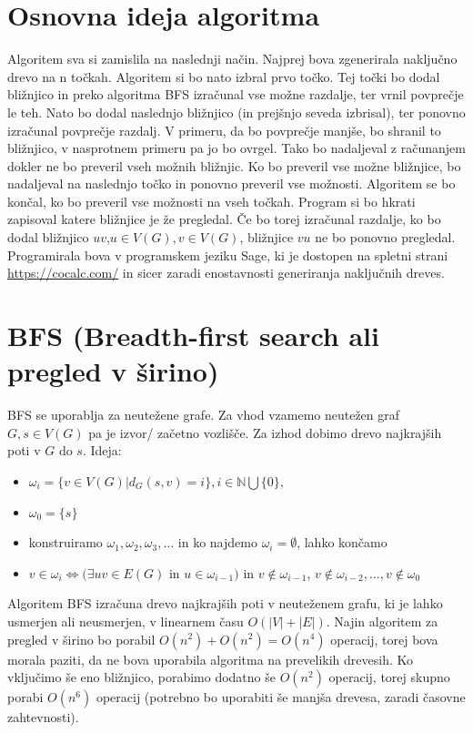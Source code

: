 \documentclass[a4paper,10pt]{article}
\begin{document}
\section{Osnovna ideja algoritma}
Algoritem sva si zamislila na naslednji način. Najprej bova zgenerirala naključno drevo na n točkah. Algoritem si bo nato izbral prvo točko. Tej točki bo dodal bližnjico in preko algoritma BFS izračunal vse možne razdalje, ter vrnil povprečje le teh. Nato bo dodal naslednjo bližnjico (in prejšnjo seveda izbrisal), ter ponovno izračunal povprečje razdalj. V primeru, da bo povprečje manjše, bo shranil to bližnjico, v nasprotnem primeru pa jo bo ovrgel. Tako bo nadaljeval z računanjem dokler ne bo preveril vseh možnih bližnjic. Ko bo preveril vse možne bližnjice, bo nadaljeval na naslednjo točko in ponovno preveril vse možnosti. Algoritem se bo končal, ko bo preveril vse možnosti na vseh točkah. 
\newline
Program si bo hkrati zapisoval katere bližnjice je že pregledal. Če bo torej izračunal razdalje, ko bo dodal bližnjico $uv$,$u \in V(G),v\in V(G)$, bližnjice $vu$ ne bo ponovno pregledal.
\newline
Programirala bova v programskem jeziku Sage, ki je dostopen na spletni strani 
\url{https://cocalc.com/}
 in sicer zaradi enostavnosti generiranja naključnih dreves.

\section{BFS (Breadth-first search ali pregled v širino)}
BFS se uporablja za neutežene grafe. Za vhod vzamemo neutežen graf $G, s\in V(G)$ pa je izvor/ začetno vozlišče. Za izhod dobimo drevo najkrajših poti v $G$ do $s$.
Ideja:
\begin{itemize}
\item $\omega_i = \lbrace v\in V(G) \vert d_G (s,v)=i \rbrace, i\in \mathbb{N} \bigcup \lbrace0\rbrace,$
\item $\omega_0=\lbrace s\rbrace$
\item konstruiramo $\omega_1 ,\omega_2,\omega_3,\dotsc $  in ko najdemo $\omega_i= \emptyset $, lahko končamo
\item $ v\in \omega_i \Leftrightarrow (\exists uv\in E(G)$  in $ u\in \omega_{i-1} )$  in $v \notin \omega_{i-1 }$, $v \notin \omega_{i-2 },\dotsc ,v \notin \omega_{0}$
\end{itemize}
Algoritem BFS izračuna drevo najkrajših poti v neuteženem grafu, ki je lahko usmerjen ali neusmerjen, v linearnem času $O(|V|+ |E|)$.
\newline
Najin algoritem za pregled v širino bo porabil $O(n^2)+ O(n^2)= O(n^4)$ operacij, torej bova morala paziti, da ne bova uporabila algoritma na prevelikih drevesih. Ko vključimo še eno bližnjico, porabimo dodatno še $O(n^2)$ operacij, torej skupno porabi $O(n^6)$ operacij (potrebno bo uporabiti še manjša drevesa, zaradi časovne zahtevnosti).
\end{document}
